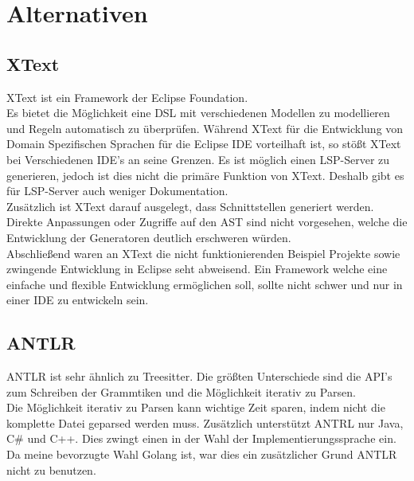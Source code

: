 \documentclass{article}
\begin{document}
\section{Alternativen}
\subsection{XText}
XText ist ein Framework der Eclipse Foundation.\\
Es bietet die Möglichkeit eine DSL mit verschiedenen Modellen zu modellieren und Regeln automatisch zu überprüfen.
Während XText für die Entwicklung von Domain Spezifischen Sprachen für die Eclipse IDE vorteilhaft ist, so stößt XText bei Verschiedenen IDE's an seine Grenzen.
Es ist möglich einen LSP-Server zu generieren, jedoch ist dies nicht die primäre Funktion von XText. Deshalb gibt es für LSP-Server auch weniger Dokumentation. \\
Zusätzlich ist XText darauf ausgelegt, dass Schnittstellen generiert werden. Direkte Anpassungen oder Zugriffe auf den AST sind nicht vorgesehen, welche die Entwicklung der Generatoren deutlich erschweren würden. \\
Abschließend waren an XText die nicht funktionierenden Beispiel Projekte sowie zwingende Entwicklung in Eclipse seht abweisend. Ein Framework welche eine einfache und flexible Entwicklung ermöglichen soll, sollte nicht schwer und nur in einer IDE zu entwickeln sein.
\subsection{ANTLR}
ANTLR ist sehr ähnlich zu Treesitter. Die größten Unterschiede sind die API's zum Schreiben der Grammtiken und die Möglichkeit iterativ zu Parsen. \\
Die Möglichkeit iterativ zu Parsen kann wichtige Zeit sparen, indem nicht die komplette Datei geparsed werden muss. Zusätzlich unterstützt ANTRL nur Java, C\# und C++. Dies zwingt einen in der Wahl der Implementierungssprache ein. Da meine bevorzugte Wahl Golang ist, war dies ein zusätzlicher Grund ANTLR nicht zu benutzen.
\end{document}
